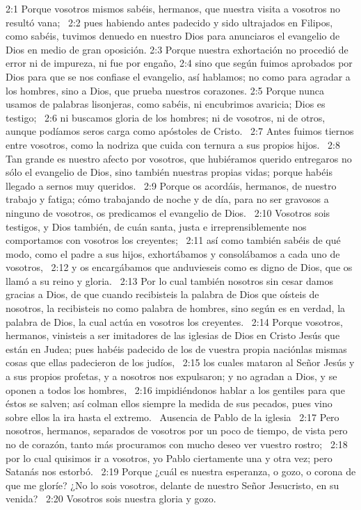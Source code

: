 2:1 Porque vosotros mismos sabéis, hermanos, que nuestra visita a vosotros no resultó vana;  
2:2 pues habiendo antes padecido y sido ultrajados en Filipos, como sabéis, tuvimos denuedo en nuestro Dios para anunciaros el evangelio de Dios en medio de gran oposición. 
2:3 Porque nuestra exhortación no procedió de error ni de impureza, ni fue por engaño, 
2:4 sino que según fuimos aprobados por Dios para que se nos confiase el evangelio, así hablamos; no como para agradar a los hombres, sino a Dios, que prueba nuestros corazones. 
2:5 Porque nunca usamos de palabras lisonjeras, como sabéis, ni encubrimos avaricia; Dios es testigo;  
2:6 ni buscamos gloria de los hombres; ni de vosotros, ni de otros, aunque podíamos seros carga como apóstoles de Cristo.  
2:7 Antes fuimos tiernos entre vosotros, como la nodriza que cuida con ternura a sus propios hijos.  
2:8 Tan grande es nuestro afecto por vosotros, que hubiéramos querido entregaros no sólo el evangelio de Dios, sino también nuestras propias vidas; porque habéis llegado a sernos muy queridos.  
2:9 Porque os acordáis, hermanos, de nuestro trabajo y fatiga; cómo trabajando de noche y de día, para no ser gravosos a ninguno de vosotros, os predicamos el evangelio de Dios.  
2:10 Vosotros sois testigos, y Dios también, de cuán santa, justa e irreprensiblemente nos comportamos con vosotros los creyentes;  
2:11 así como también sabéis de qué modo, como el padre a sus hijos, exhortábamos y consolábamos a cada uno de vosotros,  
2:12 y os encargábamos que anduvieseis como es digno de Dios, que os llamó a su reino y gloria.  
2:13 Por lo cual también nosotros sin cesar damos gracias a Dios, de que cuando recibisteis la palabra de Dios que oísteis de nosotros, la recibisteis no como palabra de hombres, sino según es en verdad, la palabra de Dios, la cual actúa en vosotros los creyentes.  
2:14 Porque vosotros, hermanos, vinisteis a ser imitadores de las iglesias de Dios en Cristo Jesús que están en Judea; pues habéis padecido de los de vuestra propia naciónlas mismas cosas que ellas padecieron de los judíos,  
2:15 los cuales mataron al Señor Jesús y a sus propios profetas, y a nosotros nos expulsaron; y no agradan a Dios, y se oponen a todos los hombres,  
2:16 impidiéndonos hablar a los gentiles para que éstos se salven; así colman ellos siempre la medida de sus pecados, pues vino sobre ellos la ira hasta el extremo.  
Ausencia de Pablo de la iglesia  
2:17 Pero nosotros, hermanos, separados de vosotros por un poco de tiempo, de vista pero no de corazón, tanto más procuramos con mucho deseo ver vuestro rostro;  
2:18 por lo cual quisimos ir a vosotros, yo Pablo ciertamente una y otra vez; pero Satanás nos estorbó.  
2:19 Porque ¿cuál es nuestra esperanza, o gozo, o corona de que me gloríe? ¿No lo sois vosotros, delante de nuestro Señor Jesucristo, en su venida?  
2:20 Vosotros sois nuestra gloria y gozo.  
